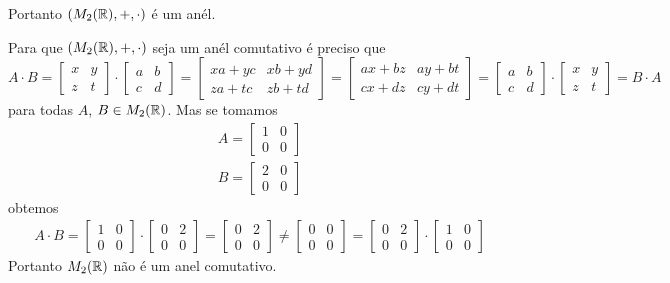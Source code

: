 \documentclass[12pt]{exam}
\begin{document}
Portanto $(M_2(\mathbb{R}), + , \cdot)$ \'e um an\'el.

Para que $(M_2(\mathbb{R}), + , \cdot)$ seja um an\'el comutativo \'e preciso que
\[
    A\cdot B = \begin{bmatrix}
        x & y\\z & t 
    \end{bmatrix} \cdot \begin{bmatrix}
        a & b\\c & d 
    \end{bmatrix} = \begin{bmatrix}
        xa + yc & xb + yd\\za + tc & zb + td 
    \end{bmatrix} = \begin{bmatrix}
        ax + bz & ay + bt\\
        cx + dz & cy + dt
    \end{bmatrix} = \begin{bmatrix}
        a & b\\c & d 
    \end{bmatrix}\cdot \begin{bmatrix}
        x & y\\z & t 
    \end{bmatrix} = B \cdot A
\]
para todas $A$, $B \in M_2(\mathbb{R})$. Mas se tomamos
\begin{align*}
    A = \begin{bmatrix}
        1 & 0\\
        0 & 0
    \end{bmatrix}\\
    B = \begin{bmatrix}
        2 & 0\\
        0 & 0
    \end{bmatrix}
\end{align*}
obtemos
\begin{align*}
    A \cdot B = \begin{bmatrix}
        1 & 0\\
        0 & 0
    \end{bmatrix}\cdot \begin{bmatrix}
        0 & 2\\
        0 & 0
    \end{bmatrix} = \begin{bmatrix}
        0 & 2\\
        0 & 0
    \end{bmatrix} \ne \begin{bmatrix}
        0 & 0\\
        0 & 0
    \end{bmatrix} = \begin{bmatrix}
        0 & 2\\
        0 & 0
    \end{bmatrix}\cdot \begin{bmatrix}
        1 & 0\\
        0 & 0
    \end{bmatrix}
\end{align*}
Portanto $M_2(\mathbb{R})$ n\~ao \'e um anel comutativo.
\end{document}
